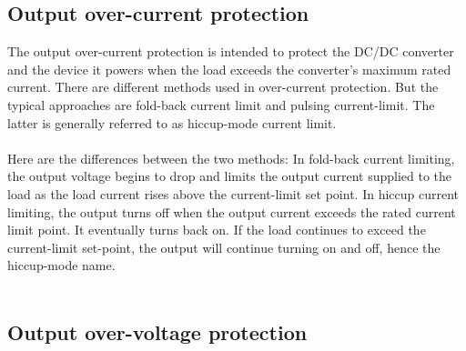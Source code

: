 \subsection{Output over-current protection}

The output over-current protection is intended to protect the DC/DC converter and the device it powers when the load exceeds the converter’s maximum rated current. There are different methods used in over-current protection. But the typical approaches are fold-back current limit and pulsing current-limit. The latter is generally referred to as hiccup-mode current limit.
\\ \\
Here are the differences between the two methods: In fold-back current limiting, the output voltage begins to drop and limits the output current supplied to the load as the load current rises above the current-limit set point. In hiccup current limiting, the output turns off when the output current exceeds the rated current limit point. It eventually turns back on. If the load continues to exceed the current-limit set-point, the output will continue turning on and off, hence the hiccup-mode name.
\\ \\
\subsection{Output over-voltage protection} 

